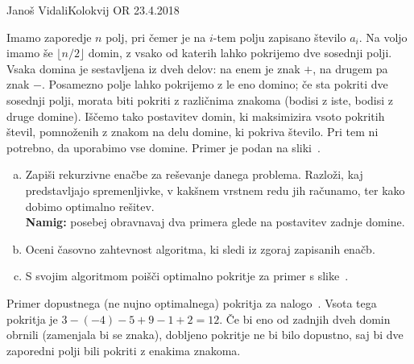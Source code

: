 \begin{naloga}{Janoš Vidali}{Kolokvij OR 23.4.2018}
\begin{vprasanje}[domine]
Imamo zaporedje $n$ polj,
pri čemer je na $i$-tem polju zapisano število $a_i$.
Na voljo imamo še $\lfloor n/2 \rfloor$ domin,
z vsako od katerih lahko pokrijemo dve sosednji polji.
Vsaka domina je sestavljena iz dveh delov:
na enem je znak $+$, na drugem pa znak $-$.
Posamezno polje lahko pokrijemo z le eno domino;
če sta pokriti dve sosednji polji, morata biti pokriti z različnima znakoma
(bodisi z iste, bodisi z druge domine).
Iščemo tako postavitev domin,
ki maksimizira vsoto pokritih števil,
pomnoženih z znakom na delu domine, ki pokriva število.
Pri tem ni potrebno, da uporabimo vse domine.
Primer je podan na sliki~\fig{}.

\begin{enumerate}[(a)]
\item Zapiši rekurzivne enačbe za reševanje danega problema.
Razloži, kaj predstavljajo spremenljivke,
v kakšnem vrstnem redu jih računamo,
ter kako dobimo optimalno rešitev. \\
{\small {\bf Namig:}
posebej obravnavaj dva primera glede na postavitev zadnje domine.}

\item Oceni časovno zahtevnost algoritma, ki sledi iz zgoraj zapisanih enačb.

\item S svojim algoritmom poišči optimalno pokritje
za primer s slike~\fig{}.
\end{enumerate}

\begin{slika}
\pgfslika
\caption{Primer dopustnega (ne nujno optimalnega) pokritja
za nalogo~\nal{}.
Vsota tega pokritja je $3 - (-4) - 5 + 9 - 1 + 2 = 12$.
Če bi eno od zadnjih dveh domin obrnili (zamenjala bi se znaka),
dobljeno pokritje ne bi bilo dopustno,
saj bi dve zaporedni polji bili pokriti z enakima znakoma.}
\end{slika}
\end{vprasanje}
\begin{odgovor}
\end{odgovor}
\end{naloga}


